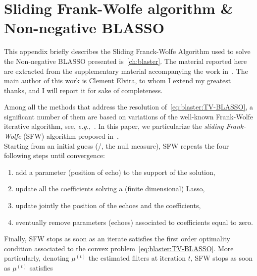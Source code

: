 \chapter{Sliding Frank-Wolfe algorithm \& Non-negative BLASSO}\label{ap:blaster}

\vspace{-2.5em}
  This appendix briefly describes the Sliding Franck-Wolfe Algorithm used to solve the Non-negative \ac{BLASSO} presented is~\cref{ch:blaster}.
The material reported here are extracted from the supplementary material accompanying the work in~.
The main author of this work is Clement Elvira, to whom I extend my greatest thanks, and I will report it for sake of completeness.

\mynewline
Among all the methods that address the resolution of~\eqref{eq:blaster:TV-BLASSO}, a significant number of them are based on variations of the well-known Frank-Wolfe iterative algorithm, see, \textit{e.g.},~.
In this paper, we particularize the \emph{sliding Frank-Wolfe} (SFW) algorithm proposed in~.
\\Starting from an initial guess (\eg/, the null measure), SFW repeats the four following steps until convergence:
\begin{enumerate}
	\item add a parameter (position of echo) to the support of the solution,
	\item update all the coefficients solving a (finite dimensional) Lasso,
	\item update jointly the position of the echoes  and the coefficients,
	\item eventually remove parameters (echoes) associated to coefficients equal to zero.
\end{enumerate}
Finally, SFW stops as soon as an iterate satisfies the first order optimality condition associated to the convex problem~\eqref{eq:blaster:TV-BLASSO}.
More particularly, denoting $\mu^{(t)}$ the estimated filters at iteration $t$, SFW stops as soon as $\mu^{(t)}$ satisfies~


